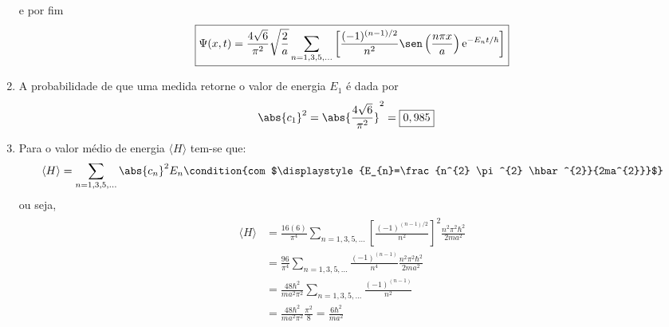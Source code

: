 \begin{prob}
\begin{sol}
\begin{enumerate}[label=\alph *)]
				e por fim
				\begin{align}
					\boxed{
						\Psi(x,t) =\frac{4\sqrt{6}}{\pi^{2}}\sqrt{\frac{2}{a}} \sum_{n=1,3,5,...}\left[\frac{(-1)^{(n-1)/2}}{n^{2}}\sen \left(\frac{n \pi x}{a}\right)\mathrm{e}^{-E_{n}t/\hbar}\right]
					}
				\end{align}
			\item A probabilidade de que uma medida retorne o valor de energia $E_{1}$ é dada por
				\begin{align}
					\abs{c_{1}}^{2} &= \abs{\frac{4\sqrt{6}}{\pi^{2}}}^{2} = \boxed{0,985} 
				\end{align}
			\item Para o valor médio de energia $\langle H \rangle$ tem-se que:
				\begin{dmath*}
					\langle H \rangle = \sum_{n=1,3,5,...}\abs{c_{n}}^{2}E_{n}\condition{com $\displaystyle{E_{n}=\frac{n^{2} \pi^{2} \hbar^{2}}{2ma^{2}}}$}
				\end{dmath*}
				ou seja,
				\begin{align}
					\begin{split}
						\langle H \rangle &= \frac{16(6)}{\pi^{4}}\sum_{n=1,3,5,...}\left[\frac{(-1)^{(n-1)/2}}{n^{2}}\right]^{2}\frac{n^{2} \pi^{2} \hbar^{2}}{2ma^{2}}\\
															&=\frac{96}{\pi^{4}}\sum_{n=1,3,5,...}\frac{(-1)^{(n-1)}}{n^{4}}\frac{n^{2} \pi^{2} \hbar^{2}}{2ma^{2}}\\
															&= \frac{48\hbar^{2}}{ma^{2}\pi^{2}}\sum_{n=1,3,5,...}\frac{(-1)^{(n-1)}}{n^{2}}\\
															&= \frac{48\hbar^{2}}{ma^{2} \pi^{2}}\frac{\pi^{2}}{8}=\boxed{\frac{6\hbar^{2}}{ma^{2}}}
					\end{split}
				\end{align}

		\end{enumerate}

	\end{sol}
\end{prob}

